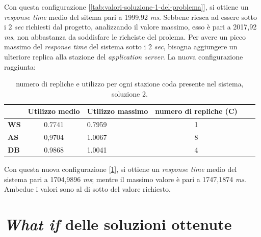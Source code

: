 \documentclass[../main.tex]{subfiles}
\begin{document}
    Con questa configurazione [\ref{tab:valori-soluzione-1-del-problema}], si ottiene un \textit{response time} medio del
    sitema pari a 1999,92 \textit{ms}.
    Sebbene riesca ad essere sotto i 2 \textit{sec} richiesti dal progetto, analizzando il valore massimo, esso è pari a
    2017,92 \textit{ms}, non abbastanza da soddisfare le richeiste del prolema.
    Per avere un picco massimo del \textit{response time} del sistema sotto i 2 \textit{sec}, bisogna aggiungere un
    ulteriore replica alla stazione del \textit{application server}.
    \newline
    La nuova configurazione raggiunta:

    \begin{table}[h]
        \centering
        \begin{tabular}{|l|c|l|c|l|c}
            \hline
            & \textbf{Utilizzo medio} & \textbf{Utilizzo massimo} & \textbf{numero di repliche (C)}  \\ [0.5ex]
            \hline
            \textbf{WS} & 0.7741                  & 0.7959                    & 1                               \\
            \textbf{AS} & 0,9704                  & 1.0067                    & 8                               \\
            \textbf{DB} & 0.9868                  & 1.0041                    & 4                               \\
            \hline
        \end{tabular}
        \caption{numero di repliche e utilizzo per ogni stazione coda presente nel sistema, soluzione 2.}
        \label{tab:valori-soluzione-2-del-problema}
    \end{table}

    Con questa nuova configurazione [\ref{tab:valori-soluzione-2-del-problema}], si ottiene un \textit{response time}
    medio del sistema pari a 1704,9896 \textit{ms}; mentre il massimo valore è pari a 1747,1874 \textit{ms}.
    Ambedue i valori sono al di sotto del valore richiesto.


    \section{\textit{What if} delle soluzioni ottenute}\label{sec:what-if-analysis}
\end{document}
